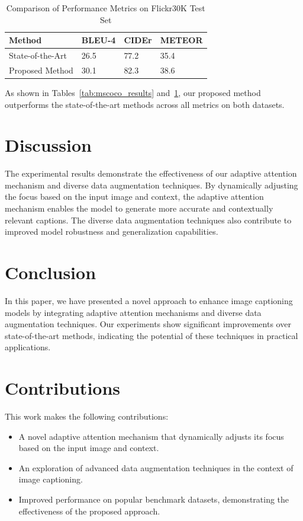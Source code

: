 \documentclass{article}
\begin{document}
\begin{table}[ht]
\centering
\caption{Comparison of Performance Metrics on Flickr30K Test Set}
\label{tab:flickr30k_results}
\begin{tabular}{@{}llll@{}}
\toprule
Method & BLEU-4 & CIDEr & METEOR \\ \midrule
State-of-the-Art & 26.5 & 77.2 & 35.4 \\
Proposed Method & 30.1 & 82.3 & 38.6 \\ \bottomrule
\end{tabular}
\end{table}

As shown in Tables~\ref{tab:mscoco_results} and~\ref{tab:flickr30k_results}, our proposed method outperforms the state-of-the-art methods across all metrics on both datasets.

\section{Discussion}
The experimental results demonstrate the effectiveness of our adaptive attention mechanism and diverse data augmentation techniques. By dynamically adjusting the focus based on the input image and context, the adaptive attention mechanism enables the model to generate more accurate and contextually relevant captions. The diverse data augmentation techniques also contribute to improved model robustness and generalization capabilities.

\section{Conclusion}
In this paper, we have presented a novel approach to enhance image captioning models by integrating adaptive attention mechanisms and diverse data augmentation techniques. Our experiments show significant improvements over state-of-the-art methods, indicating the potential of these techniques in practical applications.

\section{Contributions}
This work makes the following contributions:
\begin{itemize}
    \item A novel adaptive attention mechanism that dynamically adjusts its focus based on the input image and context.
    \item An exploration of advanced data augmentation techniques in the context of image captioning.
    \item Improved performance on popular benchmark datasets, demonstrating the effectiveness of the proposed approach.
\end{itemize}



\end{document}
